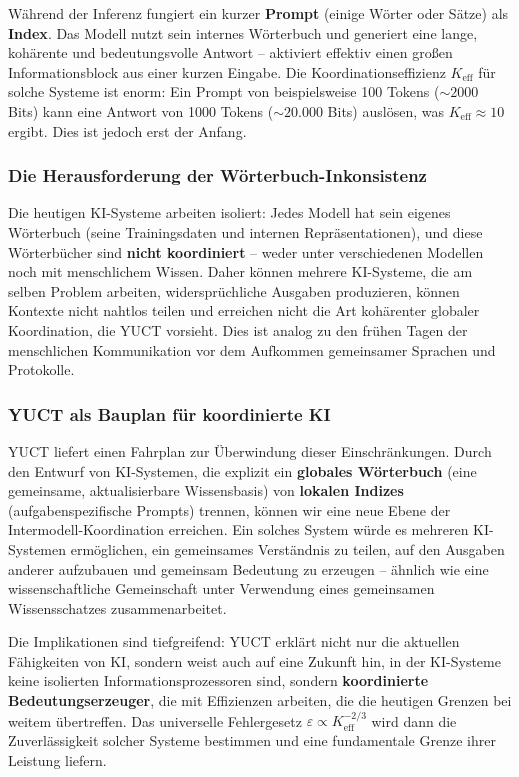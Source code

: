 \documentclass[12pt,a4paper]{article}
\theoremstyle{remark}
\newcommand{\Keff}{K_{\mathrm{eff}}}
\begin{document}
	Während der Inferenz fungiert ein kurzer \textbf{Prompt} (einige Wörter oder Sätze) als \textbf{Index}. Das Modell nutzt sein internes Wörterbuch und generiert eine lange, kohärente und bedeutungsvolle Antwort – aktiviert effektiv einen großen Informationsblock aus einer kurzen Eingabe. Die Koordinationseffizienz $\Keff$ für solche Systeme ist enorm: Ein Prompt von beispielsweise 100 Tokens ($\sim 2000$ Bits) kann eine Antwort von 1000 Tokens ($\sim 20.000$ Bits) auslösen, was $\Keff \approx 10$ ergibt. Dies ist jedoch erst der Anfang.
	
	\subsubsection{Die Herausforderung der Wörterbuch-Inkonsistenz}
	
	Die heutigen KI-Systeme arbeiten isoliert: Jedes Modell hat sein eigenes Wörterbuch (seine Trainingsdaten und internen Repräsentationen), und diese Wörterbücher sind \textbf{nicht koordiniert} – weder unter verschiedenen Modellen noch mit menschlichem Wissen. Daher können mehrere KI-Systeme, die am selben Problem arbeiten, widersprüchliche Ausgaben produzieren, können Kontexte nicht nahtlos teilen und erreichen nicht die Art kohärenter globaler Koordination, die YUCT vorsieht. Dies ist analog zu den frühen Tagen der menschlichen Kommunikation vor dem Aufkommen gemeinsamer Sprachen und Protokolle.
	
	\subsubsection{YUCT als Bauplan für koordinierte KI}
	
	YUCT liefert einen Fahrplan zur Überwindung dieser Einschränkungen. Durch den Entwurf von KI-Systemen, die explizit ein \textbf{globales Wörterbuch} (eine gemeinsame, aktualisierbare Wissensbasis) von \textbf{lokalen Indizes} (aufgabenspezifische Prompts) trennen, können wir eine neue Ebene der Intermodell-Koordination erreichen. Ein solches System würde es mehreren KI-Systemen ermöglichen, ein gemeinsames Verständnis zu teilen, auf den Ausgaben anderer aufzubauen und gemeinsam Bedeutung zu erzeugen – ähnlich wie eine wissenschaftliche Gemeinschaft unter Verwendung eines gemeinsamen Wissensschatzes zusammenarbeitet.
	
	Die Implikationen sind tiefgreifend: YUCT erklärt nicht nur die aktuellen Fähigkeiten von KI, sondern weist auch auf eine Zukunft hin, in der KI-Systeme keine isolierten Informationsprozessoren sind, sondern \textbf{koordinierte Bedeutungserzeuger}, die mit Effizienzen arbeiten, die die heutigen Grenzen bei weitem übertreffen. Das universelle Fehlergesetz $\varepsilon \propto K_{\mathrm{eff}}^{-2/3}$ wird dann die Zuverlässigkeit solcher Systeme bestimmen und eine fundamentale Grenze ihrer Leistung liefern.
	
\end{document}

